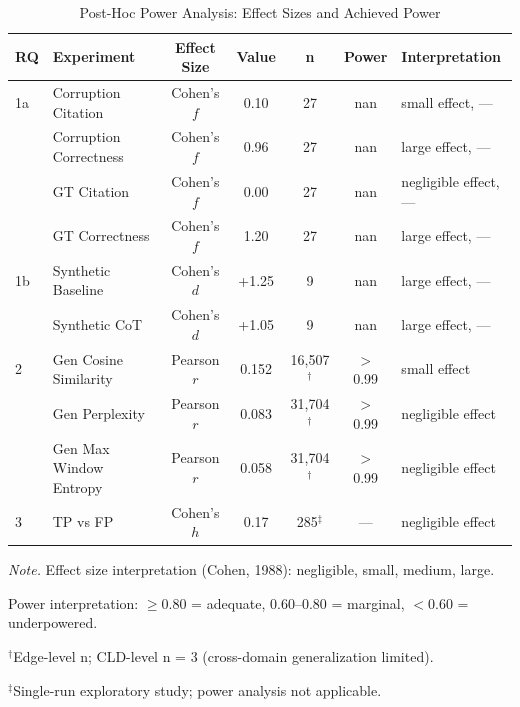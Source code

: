 \begin{table}[H]
\centering
\caption{Post-Hoc Power Analysis: Effect Sizes and Achieved Power}
\label{tab:power_analysis}
\begin{threeparttable}
\footnotesize
\begin{tabular}{llccccl}
\toprule
\textbf{RQ} & \textbf{Experiment} & \textbf{Effect Size} & \textbf{Value} & \textbf{n} & \textbf{Power} & \textbf{Interpretation} \\
\midrule
1a & Corruption Citation & Cohen's $f$ & 0.10 & 27 & nan & small effect, — \\
 & Corruption Correctness & Cohen's $f$ & 0.96 & 27 & nan & large effect, — \\
 & GT Citation & Cohen's $f$ & 0.00 & 27 & nan & negligible effect, — \\
 & GT Correctness & Cohen's $f$ & 1.20 & 27 & nan & large effect, — \\
\midrule
1b & Synthetic Baseline & Cohen's $d$ & +1.25 & 9 & nan & large effect, — \\
 & Synthetic CoT & Cohen's $d$ & +1.05 & 9 & nan & large effect, — \\
\midrule
2 & Gen Cosine Similarity & Pearson $r$ & 0.152 & 16,507$^\dagger$ & $>$0.99 & small effect \\
 & Gen Perplexity & Pearson $r$ & 0.083 & 31,704$^\dagger$ & $>$0.99 & negligible effect \\
 & Gen Max Window Entropy & Pearson $r$ & 0.058 & 31,704$^\dagger$ & $>$0.99 & negligible effect \\
\midrule
3 & TP vs FP & Cohen's $h$ & 0.17 & 285$^\ddagger$ & — & negligible effect \\
\bottomrule
\end{tabular}
\begin{tablenotes}
\scriptsize
\item \textit{Note.} Effect size interpretation (Cohen, 1988): negligible, small, medium, large.
\item Power interpretation: $\geq$0.80 = adequate, 0.60--0.80 = marginal, $<$0.60 = underpowered.
\item $^\dagger$Edge-level n; CLD-level n = 3 (cross-domain generalization limited).
\item $^\ddagger$Single-run exploratory study; power analysis not applicable.
\end{tablenotes}
\end{threeparttable}
\end{table}